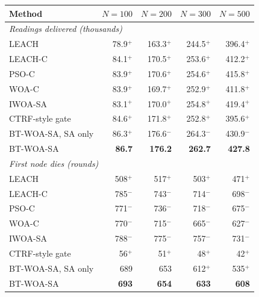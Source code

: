 \begin{tabular}{lrrrr}
\toprule
Method & $N=100$ & $N=200$ & $N=300$ & $N=500$ \\
\midrule
\multicolumn{5}{l}{\emph{Readings delivered (thousands)}} \\
LEACH & 78.9$^{+}$ & 163.3$^{+}$ & 244.5$^{+}$ & 396.4$^{+}$ \\
LEACH-C & 84.1$^{+}$ & 170.5$^{+}$ & 253.6$^{+}$ & 412.2$^{+}$ \\
PSO-C & 83.9$^{+}$ & 170.6$^{+}$ & 254.6$^{+}$ & 415.8$^{+}$ \\
WOA-C & 83.9$^{+}$ & 169.7$^{+}$ & 252.9$^{+}$ & 411.8$^{+}$ \\
IWOA-SA & 83.1$^{+}$ & 170.0$^{+}$ & 254.8$^{+}$ & 419.4$^{+}$ \\
CTRF-style gate & 84.6$^{+}$ & 171.8$^{+}$ & 252.8$^{+}$ & 395.6$^{+}$ \\
BT-WOA-SA, SA only & 86.3$^{+}$ & 176.6$^{-}$ & 264.3$^{-}$ & 430.9$^{-}$ \\
BT-WOA-SA & \textbf{86.7} & \textbf{176.2} & \textbf{262.7} & \textbf{427.8} \\
\midrule
\multicolumn{5}{l}{\emph{First node dies (rounds)}} \\
LEACH & 508$^{+}$ & 517$^{+}$ & 503$^{+}$ & 471$^{+}$ \\
LEACH-C & 785$^{-}$ & 743$^{-}$ & 714$^{-}$ & 698$^{-}$ \\
PSO-C & 771$^{-}$ & 736$^{-}$ & 718$^{-}$ & 675$^{-}$ \\
WOA-C & 770$^{-}$ & 715$^{-}$ & 665$^{-}$ & 627$^{-}$ \\
IWOA-SA & 788$^{-}$ & 775$^{-}$ & 757$^{-}$ & 731$^{-}$ \\
CTRF-style gate & 56$^{+}$ & 51$^{+}$ & 48$^{+}$ & 42$^{+}$ \\
BT-WOA-SA, SA only & 689 & 653 & 612$^{+}$ & 535$^{+}$ \\
BT-WOA-SA & \textbf{693} & \textbf{654} & \textbf{633} & \textbf{608} \\
\bottomrule
\end{tabular}

